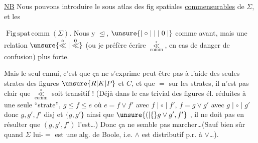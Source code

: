 \uline{NB} Nous pouvons introduire  le sous atlas  des fig  spatiales \uline{commensurables} de $\Sigma$, et  les  


 $\operatorname{Fig\,spat\,comm}(\Sigma)$. Nous y  $\trianglelefteq$, $\unsure{\mid\circ\mid|\mid0\mid}$ comme avant, mais une relation $\unsure{\overset{\circ}{\ll}|\overset{0}{\ll}}$ (ou je préfère écrire $\underset{\mathrm{comm}}{\overset{\circ}{\ll}}$, en cas de danger de confusion) plus forte.

Mais le seul ennui, c'est que ça ne  s'exprime peut-être pas à l'aide des seules strates des figures $\unsure{R|K|P}$ et $C$, et que $=$ sur les strates, il n'est pas clair que $\underset{\mathrm{comm}}{\overset{\circ}{\ll}}$ soit transitif ! (Déjà dans le cas trivial des figures él. réduites à une seule ``strate'',  $g\leq f\leq e$ où $e=f\vee f'$ avec $f\mid\circ\mid f'$, $f=g\vee g'$ avec $g\mid\circ\mid g'$ donc  $g,g',f'$  disj et  $\{g,g'\}$ ainsi que $\unsure{(|\{}g\vee g',f'\}$ , il ne doit pas en résulter que $(g,g',f')$ l'est\ldots) Donc ça ne semble pas marcher\ldots (Sauf bien sûr quand $\Sigma$ lui-$=$ est une alg. de Boole, i.e. $\wedge$ est distributif p.r. à $\vee$\ldots).


